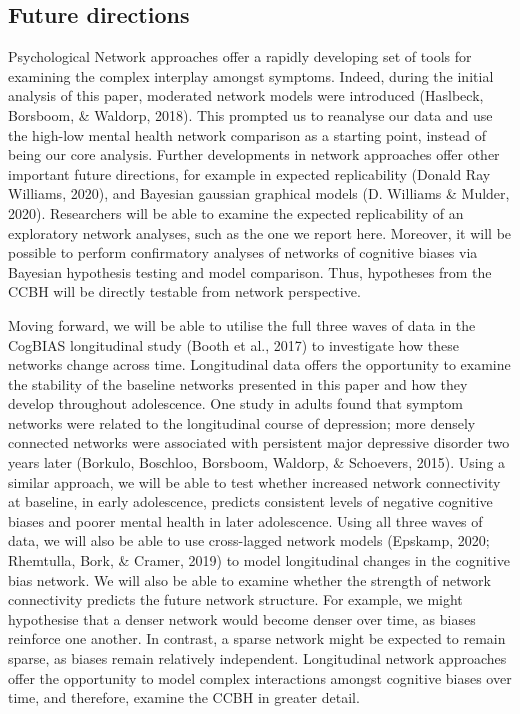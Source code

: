 \documentclass[
  english,
  man]{apa6}
\begin{document}
\hypertarget{future-directions}{%
\subsection{Future directions}\label{future-directions}}

Psychological Network approaches offer a rapidly developing set of tools for examining the complex interplay amongst symptoms. Indeed, during the initial analysis of this paper, moderated network models were introduced (Haslbeck, Borsboom, \& Waldorp, 2018). This prompted us to reanalyse our data and use the high-low mental health network comparison as a starting point, instead of being our core analysis. Further developments in network approaches offer other important future directions, for example in expected replicability (Donald Ray Williams, 2020), and Bayesian gaussian graphical models (D. Williams \& Mulder, 2020). Researchers will be able to examine the expected replicability of an exploratory network analyses, such as the one we report here. Moreover, it will be possible to perform confirmatory analyses of networks of cognitive biases via Bayesian hypothesis testing and model comparison. Thus, hypotheses from the CCBH will be directly testable from network perspective.

Moving forward, we will be able to utilise the full three waves of data in the CogBIAS longitudinal study (Booth et al., 2017) to investigate how these networks change across time. Longitudinal data offers the opportunity to examine the stability of the baseline networks presented in this paper and how they develop throughout adolescence. One study in adults found that symptom networks were related to the longitudinal course of depression; more densely connected networks were associated with persistent major depressive disorder two years later (Borkulo, Boschloo, Borsboom, Waldorp, \& Schoevers, 2015). Using a similar approach, we will be able to test whether increased network connectivity at baseline, in early adolescence, predicts consistent levels of negative cognitive biases and poorer mental health in later adolescence. Using all three waves of data, we will also be able to use cross-lagged network models (Epskamp, 2020; Rhemtulla, Bork, \& Cramer, 2019) to model longitudinal changes in the cognitive bias network. We will also be able to examine whether the strength of network connectivity predicts the future network structure. For example, we might hypothesise that a denser network would become denser over time, as biases reinforce one another. In contrast, a sparse network might be expected to remain sparse, as biases remain relatively independent. Longitudinal network approaches offer the opportunity to model complex interactions amongst cognitive biases over time, and therefore, examine the CCBH in greater detail.
\end{document}
